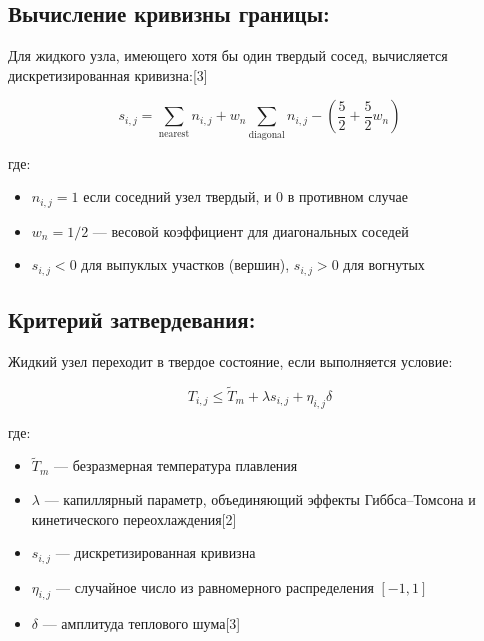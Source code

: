 \documentclass[
  12pt,
  a4paper,
  DIV=11,
  numbers=noendperiod]{scrreprt}
\providecommand{\tightlist}{%
  \setlength{\itemsep}{0pt}\setlength{\parskip}{0pt}}\usepackage{longtable,booktabs,array}
\begin{document}
\subsection{Вычисление кривизны
границы:}\label{ux432ux44bux447ux438ux441ux43bux435ux43dux438ux435-ux43aux440ux438ux432ux438ux437ux43dux44b-ux433ux440ux430ux43dux438ux446ux44b}

Для жидкого узла, имеющего хотя бы один твердый сосед, вычисляется
дискретизированная кривизна:{[}3{]}

\[
s_{i,j} = \sum_{\text{nearest}} n_{i,j} + w_n \sum_{\text{diagonal}} n_{i,j} - \left( \frac{5}{2} + \frac{5}{2} w_n \right)
\]

где:

\begin{itemize}
\tightlist
\item
  \(n_{i,j} = 1\) если соседний узел твердый, и \(0\) в противном случае
\item
  \(w_n = 1/2\) --- весовой коэффициент для диагональных соседей
\item
  \(s_{i,j} < 0\) для выпуклых участков (вершин), \(s_{i,j} > 0\) для
  вогнутых
\end{itemize}

\subsection{Критерий
затвердевания:}\label{ux43aux440ux438ux442ux435ux440ux438ux439-ux437ux430ux442ux432ux435ux440ux434ux435ux432ux430ux43dux438ux44f}

Жидкий узел переходит в твердое состояние, если выполняется условие:

\[
T_{i,j} \le \tilde{T}_m + \lambda s_{i,j} + \eta_{i,j} \delta
\]

где:

\begin{itemize}
\item
  \(\tilde{T}_m\) --- безразмерная температура плавления
\item
  \(\lambda\) --- капиллярный параметр, объединяющий эффекты
  Гиббса--Томсона и кинетического переохлаждения{[}2{]}
\item
  \(s_{i,j}\) --- дискретизированная кривизна
\item
  \(\eta_{i,j}\) --- случайное число из равномерного распределения
  \([-1, 1]\)
\item
  \(\delta\) --- амплитуда теплового шума{[}3{]}
\end{itemize}
\end{document}
